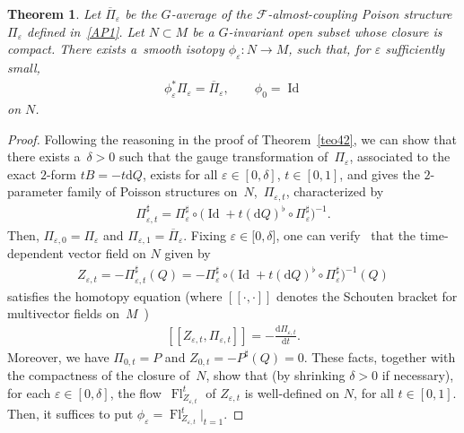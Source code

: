 \documentclass[10pt,a4paper]{amsart}
\numberwithin{equation}{section}
\newtheorem{Theorem}{Theorem}[section]
\begin{document}
\begin{Theorem}\label{teo43}
Let $\overline{\Pi}_{\varepsilon}$ be the $G$-average of the $\mathcal{F}$-almost-coupling Poison structure $\Pi_{\varepsilon}$ defined in~\eqref{AP1}. Let $N\subset M$ be a $G$-invariant open subset whose closure is compact. There exists a~smooth isotopy $\phi_{\varepsilon}\colon N\rightarrow M$, such that, for $\varepsilon$ sufficiently small,
\begin{gather*}
\phi_{\varepsilon}^{\ast}\Pi_{\varepsilon}=\overline{\Pi}_{\varepsilon},\qquad \phi_{0}=\operatorname*{Id}
\end{gather*}
on $N$.
\end{Theorem}

\begin{proof} Following the reasoning in the proof of Theorem~\ref{teo42}, we can show that there exists a~$\delta>0$ such that the gauge transformation of~$\Pi_{\varepsilon}$, associated to the exact $2$-form $tB=-t\mathrm{d}Q$, exists for all $\varepsilon \in [0,\delta]$, $t\in [0,1]$, and gives the $2$-parameter family of Poisson structures on~$N$,~$\Pi_{\varepsilon,t}$, characterized by
\begin{gather}\label{PE}
\Pi^\sharp_{\varepsilon,t}=\Pi_{\varepsilon}^{\sharp}\circ\big(\operatorname{Id}+t(\mathrm{d}Q)^{\flat}\circ\Pi_{\varepsilon}^{\sharp}\big)^{-1}.
\end{gather}
Then, $\Pi_{\varepsilon,0}=\Pi_{\varepsilon}$ and $\Pi_{\varepsilon,1} =\overline{\Pi}_{\varepsilon}$. Fixing $\varepsilon\in\lbrack0,\delta]$, one can verify~\cite{FrMa13,JVYV-14} that the time-dependent vector f\/ield on $N$ given by
\begin{gather}\label{He1}
Z_{\varepsilon,t}=-\Pi_{\varepsilon,t}^{\sharp}(Q)=-\Pi_{\varepsilon}^{\sharp} \circ\big(\operatorname{Id}+t(\mathrm{d}Q)^{\flat}\circ\Pi_{\varepsilon}^{\sharp}\big)^{-1}(Q)
\end{gather}
satisf\/ies the homotopy equation (where $[\![\cdot ,\cdot ]\!]$ denotes the Schouten bracket for multivector f\/ields on~$M$~\cite{Va-94})
\begin{gather}\label{He2}%
[\![ Z_{\varepsilon,t},\Pi_{\varepsilon,t}]\!]= -\frac{\mathrm{d}\Pi_{\varepsilon,t}}{\mathrm{d}t}.
\end{gather}
Moreover, we have $\Pi_{0,t}=P$ and $Z_{0,t}=-P^{\sharp}(Q)=0$. These facts, together with the compactness of the closure of~$N$, show that (by shrinking $\delta >0$ if necessary), for each $\varepsilon\in [0,\delta]$, the f\/low~$\operatorname*{Fl}_{Z_{\varepsilon,t}}^{t}$ of $Z_{\varepsilon,t}$ is well-def\/ined on $N$, for all $t\in [0,1]$. Then, it suf\/f\/ices to put $\phi_{\varepsilon}= \operatorname*{Fl}_{Z_{\varepsilon,t}}^{t}|_{t=1}$.
\end{proof}
\end{document}
